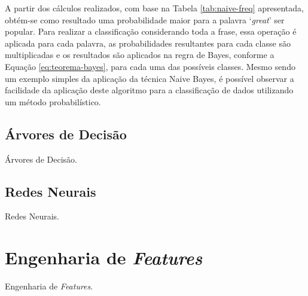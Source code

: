 \documentclass[oneside,openright,12pt]{ufsm_2015} %
\begin{document}
    \par A partir dos cálculos realizados, com base na Tabela \ref{tab:naive-freq} apresentada, obtém-se como resultado uma probabilidade maior para a palavra `\textit{great}' ser popular. Para realizar a classificação considerando toda a frase, essa operação é aplicada para cada palavra, as probabilidades resultantes para cada classe são multiplicadas e os resultados são aplicados na regra de Bayes, conforme a Equação \ref{eq:teorema-bayes}, para cada uma das possíveis classes. Mesmo sendo um exemplo simples da aplicação da técnica Naive Bayes, é possível observar a facilidade da aplicação deste algoritmo para a classificação de dados utilizando um método probabilístico.


\subsection{Árvores de Decisão}
\label{sec:arvores-decisao}

    \par Árvores de Decisão.


\subsection{Redes Neurais} %
\label{sec:redes-neurais}

    \par Redes Neurais.


\section{Engenharia de \textit{Features}}
\label{sec:eng-features}

    \par Engenharia de \textit{Features}.


\end{document}
